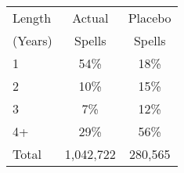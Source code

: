 \begin{tabular}{lcc}
\toprule
Length & Actual & Placebo \\
(Years) & Spells & Spells \\
\midrule
1 & 54\% & 18\% \\
2 & 10\% & 15\% \\
3 & 7\% & 12\% \\
4+ & 29\% & 56\% \\
Total &    1,042,722 &      280,565 \\
\bottomrule
\end{tabular}
